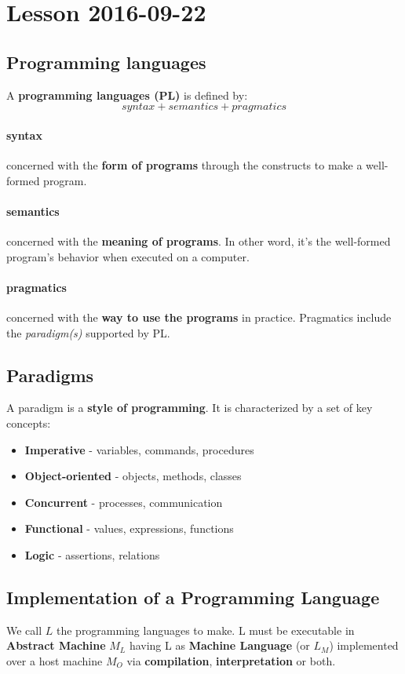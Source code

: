\section{Lesson 2016-09-22}
\subsection{Programming languages}
A \textbf{programming languages (PL)} is defined by:
\[syntax + semantics + pragmatics\]

\paragraph{syntax}
concerned with the \textbf{form of programs} through the constructs to make a
well-formed program.

\paragraph{semantics}
concerned with the \textbf{meaning of programs}. In other word, it's the
well-formed program's behavior when executed on a computer.

\paragraph{pragmatics}
concerned with the \textbf{way to use the programs} in practice. Pragmatics
include the \textit{paradigm(s)} supported by PL.

\subsection{Paradigms}
A paradigm is a \textbf{style of programming}. It is characterized by a set of
key concepts:

\begin{itemize}
\item \textbf{Imperative} - variables, commands, procedures
\item \textbf{Object-oriented} - objects, methods, classes
\item \textbf{Concurrent} - processes, communication
\item \textbf{Functional} - values, expressions, functions
\item \textbf{Logic} - assertions, relations
\end{itemize}

\subsection{Implementation of a Programming Language}
We call \(L\) the programming languages to make. L must be executable in
\textbf{Abstract Machine} \(M_L\) having L as \textbf{Machine Language} (or
\(L_M\)) implemented over a host machine \(M_O\) via \textbf{compilation},
\textbf{interpretation} or both.

